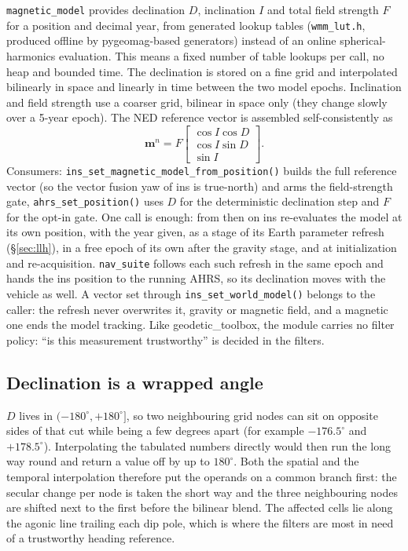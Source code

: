 \documentclass[11pt,a4paper]{article}
\newcommand{\vect}[1]{\bm{#1}}
\newcommand{\nframe}{n}
\newcommand{\code}[1]{\texttt{#1}}
\begin{document}
\code{magnetic\_\allowbreak{}model} provides declination $D$, inclination $I$ and
total field strength $F$ for a position and decimal year, from
generated lookup tables (\code{wmm\_\allowbreak{}lut.h}, produced offline by
pygeomag-based generators) instead of an online spherical-harmonics
evaluation. This means a fixed number of table lookups per call, no heap and
bounded time. The declination is stored on a fine grid and interpolated
bilinearly in space and linearly in time between the two model epochs.
Inclination and field strength use a coarser grid, bilinear in space only (they
change slowly over a 5-year epoch). The NED reference vector is
assembled self-consistently as
\begin{equation}
  \vect{m}^\nframe = F
  \begin{bmatrix}
    \cos I \cos D \\ \cos I \sin D \\ \sin I
  \end{bmatrix}.
\end{equation}
Consumers: \code{ins\_\allowbreak{}set\_\allowbreak{}magnetic\_\allowbreak{}model\_\allowbreak{}from\_\allowbreak{}position()} builds
the full reference vector (so the vector fusion yaw of ins is true-north)
and arms the field-strength gate,
\code{ahrs\_\allowbreak{}set\_\allowbreak{}position()} uses $D$ for the deterministic declination
step and $F$ for the opt-in gate.
One call is enough: from then on ins re-evaluates the model at its own
position, with the year given, as a stage of its Earth parameter refresh
(\S\ref{sec:llh}), in a free epoch of its own after the gravity stage,
and at initialization and re-acquisition. \code{nav\_\allowbreak{}suite}
follows each such refresh in the same epoch and hands the ins position to
the running AHRS, so its declination moves with the vehicle as well.
A vector set through
\code{ins\_\allowbreak{}set\_\allowbreak{}world\_\allowbreak{}model()} belongs to the
caller: the refresh never overwrites it, gravity or magnetic field, and a
magnetic one ends the model tracking. Like geodetic\_toolbox, the module
carries no filter policy: ``is this measurement trustworthy'' is
decided in the filters.

\subsection{Declination is a wrapped angle}
\label{sec:wmm-wrap}

$D$ lives in $(-180^\circ, +180^\circ]$, so two neighbouring grid nodes
can sit on opposite sides of that cut while being a few degrees apart
(for example $-176.5^\circ$ and $+178.5^\circ$). Interpolating the
tabulated numbers directly would then run the long way round and return
a value off by up to $180^\circ$. Both the spatial and the temporal
interpolation therefore put the operands on a common branch first: the
secular change per node is taken the short way and the three
neighbouring nodes are shifted next to the first before the bilinear
blend. The affected cells lie along the agonic line trailing each dip
pole, which is where the filters are most in need of a trustworthy
heading reference.
\end{document}
